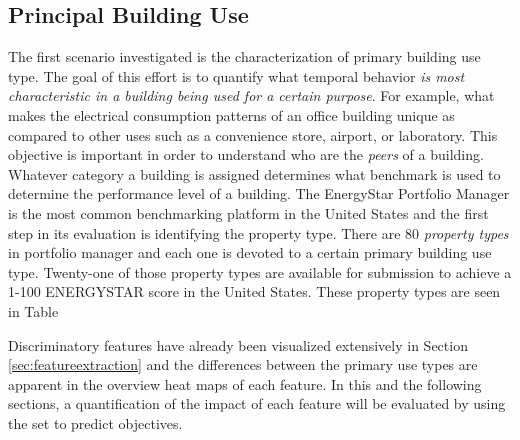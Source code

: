 \subsection{Principal Building Use}
\label{sec:buildinguse}

The first scenario investigated is the characterization of primary building use type. The goal of this effort is to quantify what temporal behavior \emph{is most characteristic in a building being used for a certain purpose}. For example, what makes the electrical consumption patterns of an office building unique as compared to other uses such as a convenience store, airport, or laboratory. This objective is important in order to understand who are the \emph{peers} of a building. Whatever category a building is assigned determines what benchmark is used to determine the performance level of a building. The EnergyStar Portfolio Manager is the most common benchmarking platform in the United States and the first step in its evaluation is identifying the property type. There are 80 \emph{property types} in portfolio manager and each one is devoted to a certain primary building use type. Twenty-one of those property types are available for submission to achieve a 1-100 ENERGYSTAR score in the United States. These property types are seen in Table



Discriminatory features have already been visualized extensively in Section \ref{sec:featureextraction} and the differences between the primary use types are apparent in the overview heat maps of each feature. In this and the following sections, a quantification of the impact of each feature will be evaluated by using the set to predict objectives.